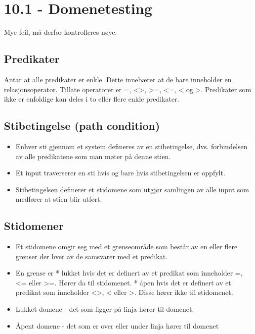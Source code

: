 \section{10.1 - Domenetesting}

Mye feil, må derfor kontrolleres nøye.

\subsection{Predikater}

Antar at alle predikater er enkle. Dette innebærer at de bare inneholder
en relasjonsoperator. Tillate operatorer er =,
\textless{}\textgreater{}, \textgreater{}=, \textless{}=, \textless{} og
\textgreater{}. Predikater som ikke er enfoldige kan deles i to eller
flere enkle predikater.

\subsection{Stibetingelse (path condition)}

\begin{itemize}
\item
  Enhver sti gjennom et system defineres av en stibetingelse, dvs.
  forbindelsen av alle predikatene som man møter på denne stien.
\item
  Et input traverserer en sti hvis og bare hvis stibetingelsen er
  oppfylt.
\item
  Stibetingelsen definerer et stidomene som utgjør samlingen av alle
  input som medfører at stien blir utført.
\end{itemize}
\subsection{Stidomener}

\begin{itemize}
\item
  Et stidomene omgir seg med et grenseområde som består av en eller
  flere grenser der hver av de samsvarer med et predikat.
\item
  En grense er * lukket hvis det er definert av et predikat som
  inneholder =, \textless{}= eller \textgreater{}=. Hører da til
  stidomenet. * åpen hvis det er definert av et predikat som inneholder
  \textless{}\textgreater{}, \textless{} eller \textgreater{}. Disse
  hører ikke til stidomenet.
\item
  Lukket domene - det som ligger på linja hører til domenet.
\item
  Åpent domene - det som er over eller under linja hører til domenet
\end{itemize}
